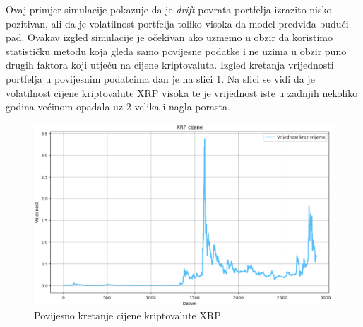 \documentclass[zavrsnirad, upload]{fer}
\begin{document}
Ovaj primjer simulacije pokazuje da je \textit{drift} povrata portfelja izrazito
nisko pozitivan, ali da je volatilnost portfelja toliko visoka da model predviđa
budući pad. Ovakav izgled simulacije je očekivan ako uzmemo u obzir da koristimo
statističku metodu koja gleda samo povijesne podatke i ne uzima u obzir
puno drugih faktora koji utječu na cijene kriptovaluta. Izgled kretanja
vrijednosti portfelja u povijesnim podatcima dan je na slici \ref{fig:XRP_hist}.
Na slici se vidi da je volatilnost cijene kriptovalute XRP
visoka te je vrijednost iste u zadnjih nekoliko godina
većinom opadala uz 2 velika i nagla porasta.
\begin{figure}[H]
    \centering
    \includegraphics[width=1.0\textwidth]{Figures/XRP_hist.png}
    \caption{Povijesno kretanje cijene kriptovalute XRP}
    \label{fig:XRP_hist}
\end{figure}
\end{document}
